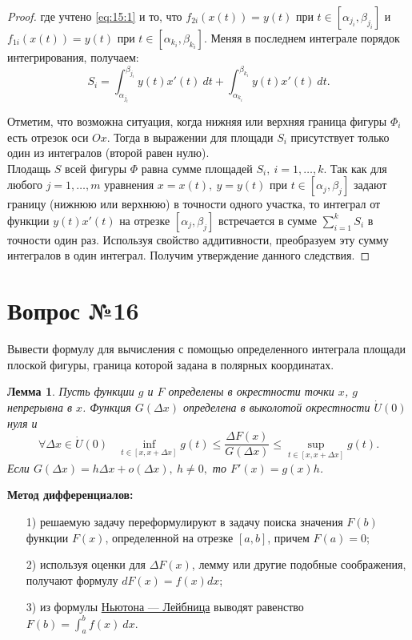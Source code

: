 \documentclass[12pt]{report}
\numberwithin{equation}{section}
\newtheorem{lemma}{Лемма}[section]
\begin{document}
\begin{proof}
где учтено \eqref{eq:15:1} и то, что $f_{2i} (x(t)) = y(t)$ при $t \in [\alpha_{j_i}, \beta_{j_i}]$ и $f_{1i}(x(t)) = y(t)$ при $t \in [\alpha_{k_i}, \beta_{k_i}]$. Меняя в последнем интеграле порядок интегрирования, получаем:
\[ S_i = \int_{\alpha_{j_i}}^{\beta_{j_i}} y(t) x'(t)~dt + \int_{\alpha_{k_i}}^{\beta_{k_i}} y(t) x'(t)~dt.\]

Отметим, что возможна ситуация, когда нижняя или верхняя граница фигуры $\Phi_i$ есть отрезок оси $Ox$. Тогда в выражении для площади $S_i$ присутствует только один из интегралов (второй равен нулю).\\

Плодащь $S$ всей фигуры $\Phi$ равна сумме площадей $S_i,~i = 1,\ldots,k$. Так как для любого $j = 1,\ldots,m$ уравнения $x= x(t),~y = y(t)$ при $t \in [\alpha_j, \beta_j]$ задают границу (нижнюю или верхнюю) в точности одного участка, то интеграл от функции $y(t) x'(t)$ на отрезке $[\alpha_j, \beta_j]$ встречается в сумме $\sum\limits_{i=1}^k S_i$ в точности один раз. Используя свойство аддитивности, преобразуем эту сумму интегралов в один интеграл. Получим утверждение данного следствия.
\end{proof}

\newpage \section{Вопрос №16} %
\begin{framed}
Вывести формулу для вычисления с помощью определенного интеграла площади плоской
фигуры, граница которой задана в полярных координатах.
\end{framed}

\begin{lemma} \label{lemm:16:1}
Пусть функции $g$ и $F$ определены в окрестности точки $x$, $g$ непрерывна в $x$. Функция $G(\Delta x)$ определена в выколотой окрестности $\dot{U}(0)$ нуля и
\[ \forall \Delta x \in \dot{U}(0)~~~~ \inf_{t \in [x,x + \Delta x]}g(t) \leqslant \frac{\Delta F(x)}{G(\Delta x)} \leqslant \sup_{t \in[x,x + \Delta x]} g(t).\]
Если $G(\Delta x) = h \Delta x + o(\Delta x),~h \neq 0,$ то $F'(x) = g(x)h$.\\
\end{lemma}

\textbf{Метод дифференциалов:}
\begin{enumerate}
\item[1)] решаемую задачу переформулируют в задачу поиска значения $F(b)$ функции $F(x)$, определенной на отрезке $[a,b]$, причем $F(a) = 0$;
\item[2)] используя оценки для $\Delta F(x)$, лемму или другие подобные соображения, получают формулу $dF(x) = f(x)dx$;
\item[3)] из формулы \hyperref[th:11:1]{Ньютона --- Лейбница} выводят равенство $F(b) = \int_a^b f(x)~dx$.\\
\end{enumerate}
\end{document}
